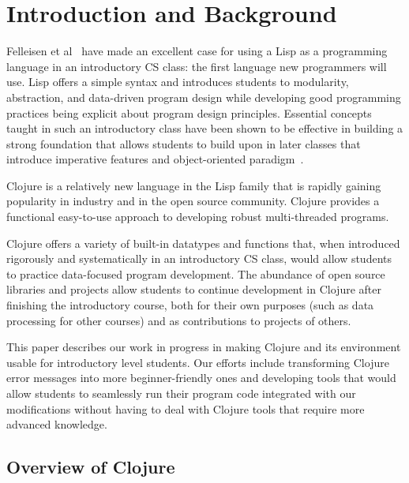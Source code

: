 \documentclass[12pt]{article}
\newcommand{\comment}[1]{{\bf \tt  {#1}}}
\newcommand{\emcomment}[1]{\textcolor{ForestGreen}{\comment{Elena: {#1}}}}
\newcommand{\escomment}[1]{\textcolor{BlueViolet}{\comment{Emma: {#1}}}}
\begin{document}

\newpage
\setcounter{page}{1}

\section{Introduction and Background}\label{sec:intro}
Felleisen et al~\cite{Felleisen:2004} have made an excellent case for
using a Lisp as a programming language in an introductory CS class:
the first language new programmers will use. Lisp offers a simple
syntax and introduces students to modularity, abstraction, and
data-driven program design while developing good programming
practices being explicit about program design principles.
Essential concepts taught in such an
introductory class have been shown to be effective in building a
strong foundation that allows students to
build upon in later classes that introduce imperative features and 
object-oriented paradigm~\cite{Bieniusa:2008}. 

Clojure is a relatively new language in the Lisp family that is
rapidly gaining popularity in industry and in the open source
community. Clojure provides a functional easy-to-use approach to
developing robust multi-threaded programs. 
 
Clojure offers a variety of built-in datatypes and
functions that, when introduced rigorously and systematically in an
introductory CS class, would allow students to practice data-focused program
development. The abundance of open
source libraries and projects allow students to continue development
in Clojure after finishing the introductory course, both for their own
purposes (such as data processing for other courses) and as
contributions to projects of others.  

This paper describes our work in progress in making Clojure and its
environment usable for introductory level students. Our efforts
include transforming Clojure error messages into more
beginner-friendly ones and developing tools that would allow students
to seamlessly run their program code integrated with our
modifications without having to deal with Clojure tools that require
more advanced knowledge. 

\subsection{Overview of Clojure}\label{sec:clojure}
  
\end{document}
